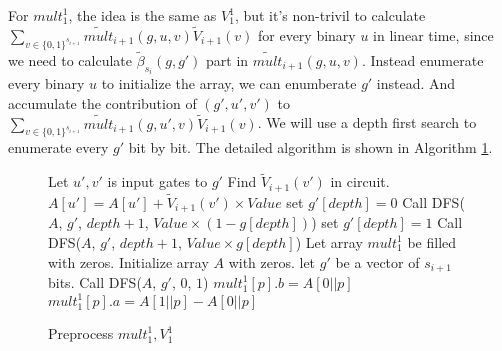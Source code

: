For ${mult}_1^1$, the idea is the same as ${V}_1^1$, but it's non-trivil to calculate $\sum_{v\in \{0,1\}^{s_{i+1}}}\tilde{mult}_{i+1}(g, u, v)\tilde{V}_{i+1}(v)$ for every binary $u$ in linear time, since we need to calculate $\tilde{\beta}_{s_{i}}(g, g')$ part in $\tilde{mult}_{i+1}(g, u, v)$. Instead enumerate every binary $u$ to initialize the array, we can enumberate $g'$ instead. And accumulate the contribution of $(g', u', v')$ to $\sum_{v\in \{0,1\}^{s_{i+1}}}\tilde{mult}_{i+1}(g, u', v)\tilde{V}_{i+1}(v)$. We will use a depth first search to enumerate every $g'$ bit by bit. The detailed algorithm is shown in Algorithm \ref{alg::premult}.
\begin{figure}[p]
\begin{algorithm}[H]
\label{alg::premult}
\caption{Preprocess ${mult}_1^1, {V}_1^1$}
\begin{algorithmic}[1]
	 
		\State Let $u', v'$ is input gates to $g'$
		\State Find $\tilde{V}_{i+1}(v')$ in circuit.
		\State $A[u'] = A[u'] + \tilde{V}_{i+1}(v')\times Value$
	\Else
		\State set $g'[depth]=0$
		\State Call {\sf DFS}($A$, $g'$, $depth+1$, $Value\times(1-g[depth])$)
		\State set $g'[depth]=1$
		\State Call {\sf DFS}($A$, $g'$, $depth+1$, $Value\times g[depth]$)
	\EndIf
\EndProcedure
{}
	\State Let array ${mult}_1^1$ be filled with zeros.
	\State Initialize array $A$ with zeros.
	\State let $g'$ be a vector of $s_{i+1}$ bits.
	\State Call {\sf DFS}($A$, $g'$, $0$, $1$)
		\State ${mult}_1^1[p].b=A[0||p]$
		\State ${mult}_1^1[p].a=A[1||p]-A[0||p]$
	\EndFor
\EndProcedure
\end{algorithmic}
\end{algorithm}
\end{figure}

